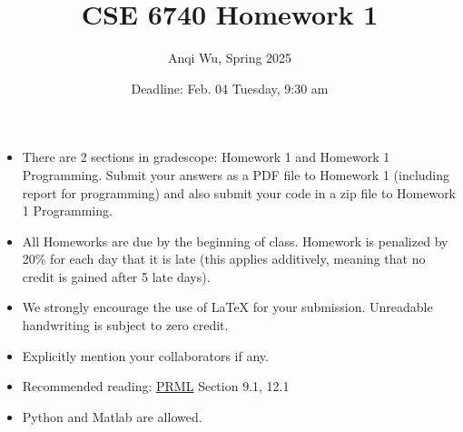 \documentclass[11pt,epic]{article}
\begin{document}
\title{CSE 6740 Homework 1}
\author{Anqi Wu, Spring 2025}
\date{Deadline: Feb. 04 Tuesday, 9:30 am}
\maketitle

\begin{itemize}
  \item There are 2 sections in gradescope: Homework 1 and Homework 1 Programming. Submit your answers as a PDF file to Homework 1 (including report for  programming) and also submit your code in a zip file to Homework 1 Programming. 
  \item All Homeworks are due by the beginning of class. Homework is penalized by 20\% for each day that it is late (this applies additively, meaning that no credit is gained after 5 late days). 
  \item We strongly encourage the use of LaTeX for your submission. Unreadable handwriting is subject to zero credit. 
  \item Explicitly mention your collaborators if any.
  \item Recommended reading: \href{https://www.microsoft.com/en-us/research/uploads/prod/2006/01/Bishop-Pattern-Recognition-and-Machine-Learning-2006.pdf}{PRML} Section 9.1, 12.1
    \item Python and Matlab are allowed.
\end{itemize}
\end{document}
